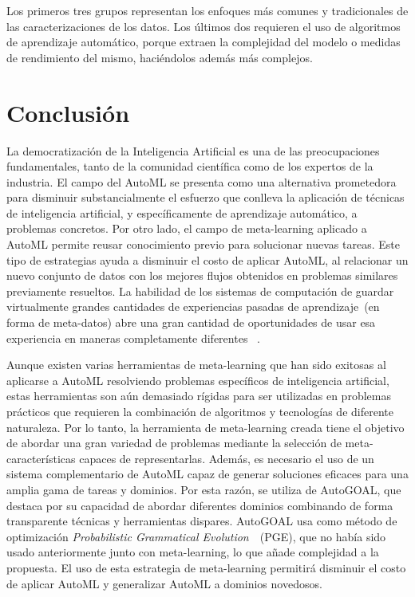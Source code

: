 Los primeros tres grupos representan los enfoques más comunes y tradicionales
de las caracterizaciones de los datos. Los últimos dos requieren el uso de
algoritmos de aprendizaje automático, porque extraen la complejidad del modelo
o medidas de rendimiento del mismo, haciéndolos además más complejos.

\section{Conclusión}\label{sec:conclusion}

La democratización de la Inteligencia Artificial es una de las preocupaciones
fundamentales, tanto de la comunidad científica como de los expertos de la
industria. El campo del AutoML se presenta como una alternativa prometedora
para disminuir substancialmente el esfuerzo que conlleva la aplicación de
técnicas de inteligencia artificial, y específicamente de aprendizaje
automático, a problemas concretos. Por otro lado, el campo de meta-learning
aplicado a AutoML permite reusar conocimiento previo para solucionar nuevas
tareas. Este tipo de estrategias ayuda a disminuir el costo de aplicar AutoML,
al relacionar un nuevo conjunto de datos con los mejores flujos obtenidos en
problemas similares previamente resueltos. La habilidad de los sistemas de
computación de guardar virtualmente grandes cantidades de experiencias pasadas
de aprendizaje~(en forma de meta-datos) abre una gran cantidad de oportunidades
de usar esa experiencia en maneras completamente diferentes
~.

Aunque existen varias herramientas de meta-learning que han sido exitosas al
aplicarse a AutoML resolviendo problemas específicos de inteligencia
artificial, estas herramientas son aún demasiado rígidas para ser utilizadas
en problemas prácticos que requieren la combinación de algoritmos y tecnologías
de diferente naturaleza. Por lo tanto, la herramienta de meta-learning creada
tiene el objetivo de abordar una gran variedad de problemas mediante la
selección de meta-características capaces de representarlas. Además, es
necesario el uso de un sistema complementario de AutoML capaz de generar
soluciones eficaces para una amplia gama de tareas y dominios. Por esta razón,
se utiliza de AutoGOAL, que destaca por su
capacidad de abordar diferentes dominios combinando de forma transparente
técnicas y herramientas dispares. AutoGOAL usa como método de optimización
\textit{Probabilistic Grammatical Evolution}~~(PGE),
que no había sido usado anteriormente junto con meta-learning, lo que añade
complejidad a la propuesta. El uso de esta estrategia de meta-learning
permitirá disminuir el costo de aplicar AutoML y generalizar AutoML a dominios
novedosos.
